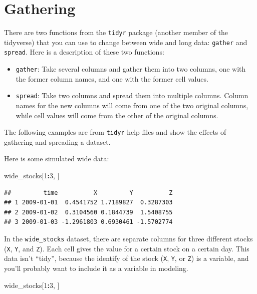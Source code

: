 \documentclass[]{book}
\makeatletter
\newenvironment{Shaded}{\begin{snugshade}}{\end{snugshade}}
\newcommand{\DecValTok}[1]{\textcolor[rgb]{0.00,0.00,0.81}{#1}}
\newcommand{\OperatorTok}[1]{\textcolor[rgb]{0.81,0.36,0.00}{\textbf{#1}}}
\newcommand{\NormalTok}[1]{#1}
\providecommand{\tightlist}{%
  \setlength{\itemsep}{0pt}\setlength{\parskip}{0pt}}
\newenvironment{kframe}{%
\medskip{}
\setlength{\fboxsep}{.8em}
 \def\at@end@of@kframe{}%
 \ifinner\ifhmode%
  \def\at@end@of@kframe{\end{minipage}}%
  \begin{minipage}{\columnwidth}%
 \fi\fi%
 \def\FrameCommand##1{\hskip\@totalleftmargin \hskip-\fboxsep
 \colorbox{shadecolor}{##1}\hskip-\fboxsep
     \hskip-\linewidth \hskip-\@totalleftmargin \hskip\columnwidth}%
 \MakeFramed {\advance\hsize-\width
   \@totalleftmargin\z@ \linewidth\hsize
   \@setminipage}}%
 {\par\unskip\endMakeFramed%
 \at@end@of@kframe}
\renewenvironment{Shaded}{\begin{kframe}}{\end{kframe}}
\theoremstyle{definition}
\theoremstyle{definition}
\theoremstyle{definition}
\theoremstyle{remark}
\makeatother
\begin{document}
\section{Gathering}\label{gathering}

There are two functions from the \texttt{tidyr} package (another member
of the tidyverse) that you can use to change between wide and long data:
\texttt{gather} and \texttt{spread}. Here is a description of these two
functions:

\begin{itemize}
\tightlist
\item
  \texttt{gather}: Take several columns and gather them into two
  columns, one with the former column names, and one with the former
  cell values.
\item
  \texttt{spread}: Take two columns and spread them into multiple
  columns. Column names for the new columns will come from one of the
  two original columns, while cell values will come from the other of
  the original columns.
\end{itemize}

The following examples are from \texttt{tidyr} help files and show the
effects of gathering and spreading a dataset.

Here is some simulated wide data:

\begin{Shaded}
\begin{Highlighting}[]
\NormalTok{wide_stocks[}\DecValTok{1}\OperatorTok{:}\DecValTok{3}\NormalTok{, ]}
\end{Highlighting}
\end{Shaded}

\begin{verbatim}
##         time          X         Y          Z
## 1 2009-01-01  0.4541752 1.7189827  0.3287303
## 2 2009-01-02  0.3104560 0.1844739  1.5408755
## 3 2009-01-03 -1.2961803 0.6930461 -1.5702774
\end{verbatim}

In the \texttt{wide\_stocks} dataset, there are separate columns for
three different stocks (\texttt{X}, \texttt{Y}, and \texttt{Z}). Each
cell gives the value for a certain stock on a certain day. This data
isn't ``tidy'', because the identify of the stock (\texttt{X},
\texttt{Y}, or \texttt{Z}) is a variable, and you'll probably want to
include it as a variable in modeling.

\begin{Shaded}
\begin{Highlighting}[]
\NormalTok{wide_stocks[}\DecValTok{1}\OperatorTok{:}\DecValTok{3}\NormalTok{, ]}
\end{Highlighting}
\end{Shaded}
\end{document}
